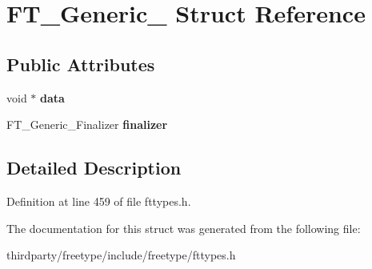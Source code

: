 \hypertarget{struct_f_t___generic__}{}\section{F\+T\+\_\+\+Generic\+\_\+ Struct Reference}
\label{struct_f_t___generic__}
\subsection*{Public Attributes}
\begin{DoxyCompactItemize}
\item 
\mbox{\label{struct_f_t___generic___af0bf8b983254b662f293e9a20505e27e}} 
void $\ast$ {\bfseries data}
\item 
\mbox{\label{struct_f_t___generic___a20fce8de90cc9e3876935817247b9ccc}} 
F\+T\+\_\+\+Generic\+\_\+\+Finalizer {\bfseries finalizer}
\end{DoxyCompactItemize}


\subsection{Detailed Description}


Definition at line 459 of file fttypes.\+h.



The documentation for this struct was generated from the following file\+:\begin{DoxyCompactItemize}
\item 
thirdparty/freetype/include/freetype/fttypes.\+h\end{DoxyCompactItemize}
